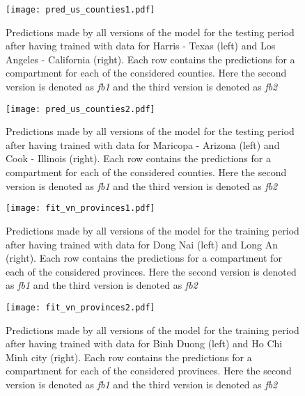 \begin{figure}[!htb]
    \centering
    \texttt{[image: pred\_us\_counties1.pdf]}
    \caption[Model forecast for US counties 1]{Predictions made by all versions of the model for the testing period after having trained with data for Harris - Texas (left) and Los Angeles - California (right). Each row contains the predictions for a compartment for each of the considered counties. Here the second version is denoted as \textit{fb1} and the third version is denoted as \textit{fb2}}
    \label{fig:pred-us-counties1}
\end{figure}

\begin{figure}[!htb]
    \centering
    \texttt{[image: pred\_us\_counties2.pdf]}
    \caption[Model forecast for US counties 2]{Predictions made by all versions of the model for the testing period after having trained with data for Maricopa - Arizona (left) and Cook - Illinois (right). Each row contains the predictions for a compartment for each of the considered counties. Here the second version is denoted as \textit{fb1} and the third version is denoted as \textit{fb2}}
    \label{fig:pred-us-counties2}
\end{figure}

\begin{figure}[!htb]
    \centering
    \texttt{[image: fit\_vn\_provinces1.pdf]}
    \caption[Model fit for Vietnam provinces 1]{Predictions made by all versions of the model for the training period after having trained with data for Dong Nai (left) and Long An (right). Each row contains the predictions for a compartment for each of the considered provinces. Here the second version is denoted as \textit{fb1} and the third version is denoted as \textit{fb2}}
    \label{fig:fit-vn-provinces1}
\end{figure}

\begin{figure}[!htb]
    \centering
    \texttt{[image: fit\_vn\_provinces2.pdf]}
    \caption[Model fit for Vietnam provinces 2]{Predictions made by all versions of the model for the training period after having trained with data for Binh Duong (left) and Ho Chi Minh city (right). Each row contains the predictions for a compartment for each of the considered provinces. Here the second version is denoted as \textit{fb1} and the third version is denoted as \textit{fb2}}
    \label{fig:fit-vn-provinces2}
\end{figure}

